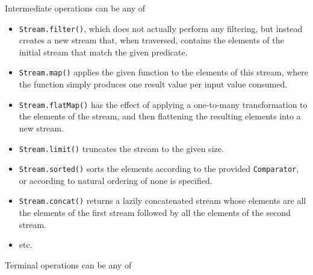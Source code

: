 \documentclass[table, xcdraw]{article}%
\begin{document}
Intermediate operations can be any of

\begin{itemize}
    \item \texttt{Stream.filter()}, which does not actually perform any filtering, but instead creates a new stream that, when traversed, contains the elements of the initial stream that match the given predicate.
    \item \texttt{Stream.map()} applies the given function to the elements of this stream, where the function simply produces one result value per input value consumed.
    \item \texttt{Stream.flatMap()} has the effect of applying a one-to-many transformation to the elements of the stream, and then flattening the resulting elements into a new stream.
    \item \texttt{Stream.limit()} truncates the stream to the given size.
    \item \texttt{Stream.sorted()} sorts the elements according to the provided \texttt{Comparator}, or according to natural ordering of none is specified.
    \item \texttt{Stream.concat()} returns a lazily concatenated stream whose elements are all the elements of the first stream followed by all the elements of the second stream.
    \item etc.
\end{itemize}

Terminal operations can be any of
\end{document}
